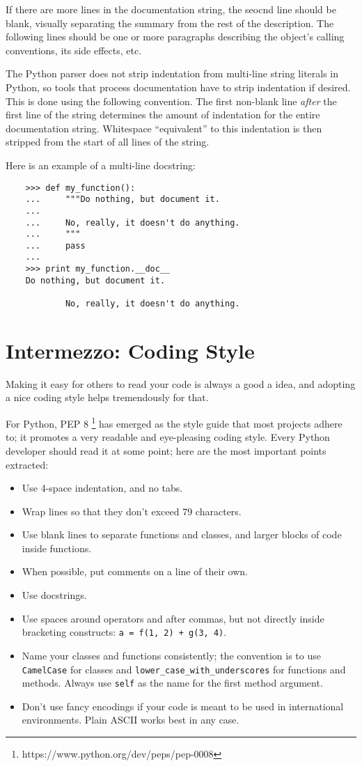 \documentclass[UTF8]{article}
\begin{document}
If there are more lines in the documentation string, the seocnd line should be blank, visually
separating the summary from the rest of the description. The following lines should be one or more
paragraphs describing the object's calling conventions, its side effects, etc.

The Python parser does not strip indentation from multi-line string literals in Python, so tools
that process documentation have to strip indentation if desired. This is done using the following
convention. The first non-blank line \emph{after} the first line of the string determines the
amount of indentation for the entire documentation string. Whitespace ``equivalent'' to this
indentation is then stripped from the start of all lines of the string.

Here is an example of a multi-line docstring:
\begin{verbatim}
    >>> def my_function():
    ...     """Do nothing, but document it.
    ...
    ...     No, really, it doesn't do anything.
    ...     """
    ...     pass
    ...
    >>> print my_function.__doc__
    Do nothing, but document it.

            No, really, it doesn't do anything.

\end{verbatim}

\section{Intermezzo: Coding Style}
Making it easy for others to read your code is always a good a idea, and adopting a nice coding
style helps tremendously for that.

For Python, PEP 8 \footnote{https://www.python.org/dev/peps/pep-0008} has emerged as the style
guide that most projects adhere to; it promotes a very readable and eye-pleasing coding style.
Every Python developer should read it at some point; here are the most important points extracted:
\begin{itemize}
    \item Use 4-space indentation, and no tabs.
    \item Wrap lines so that they don't exceed 79 characters.
    \item Use blank lines to separate functions and classes, and larger blocks of code inside
    functions.
    \item When possible, put comments on a line of their own.
    \item Use docstrings.
    \item Use spaces around operators and after commas, but not directly inside bracketing
    constructs: \texttt{a = f(1, 2) + g(3, 4)}.
    \item Name your classes and functions consistently; the convention is to use \texttt{CamelCase}
    for classes and \texttt{lower\_case\_with\_underscores} for functions and methods. Always use
    \texttt{self} as the name for the first method argument.
    \item Don't use fancy encodings if your code is meant to be used in international environments.
    Plain ASCII works best in any case.
\end{itemize}
\end{document}
